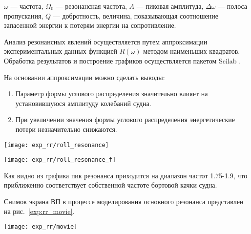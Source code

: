 $\omega$ --- частота, $\Omega_0$ --- резонансная частота, $A$ --- пиковая амплитуда, $\Delta \omega$ --- полоса пропускания, $Q$ --- добротность, величина, показывающая соотношение запасенной энергии к потерям энергии на сопротивление.

Анализ резонансных явлений осуществляется путем аппроксимации экспериментальных данных функцией $R(\omega)$ методом наименьших квадратов. Обработка результатов и построение графиков осуществляется пакетом Scilab \citep{scilab}.


На основании аппроксимации можно сделать выводы:
\begin{enumerate}
	\item	Параметр формы углового распределения значительно влияет на установившуюся амплитуду колебаний судна.
	\item 	При увеличении значения формы углового распределения энергетические потери незначительно снижаются.
\end{enumerate}

\begin{sidewaysfigure}
	\texttt{[image: exp\_rr/roll\_resonance]}
	\caption{Экспериментальные данные соотношения 10\%-ной обеспеченность модуля угла бортовой качки к энергии волнения.}
	\label{rr:data}
\end{sidewaysfigure}

\begin{sidewaysfigure}
	\texttt{[image: exp\_rr/roll\_resonance\_f]}
	\caption{Аппроксимация данных соотношения 10\%-ной обеспеченность модуля угла бортовой качки к энергии волнения и параметры функции отклика.}
	\label{rr:dataf}
\end{sidewaysfigure}


Как видно из графика пик резонанса приходится на диапазон частот 1.75-1.9, что приближенно соответствует собственной частоте бортовой качки судна.

Снимок экрана ВП в процессе моделирования основного резонанса представлен на рис.~\ref{exp:rr_movie}.

\begin{sidewaysfigure}
	\begin{center}
	\texttt{[image: exp\_rr/movie]}
	\end{center}
	\caption{Опасный крен вызванный параметрическим резонансом}
	\label{exp:rr_movie}
\end{sidewaysfigure}



